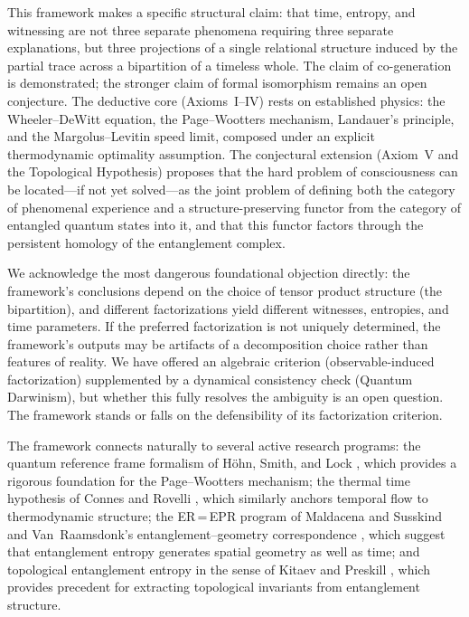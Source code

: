 \documentclass[12pt, a4paper]{article}
\begin{document}
This framework makes a specific structural claim: that time, entropy, and witnessing are not three separate phenomena requiring three separate explanations, but three projections of a single relational structure induced by the partial trace across a bipartition of a timeless whole. The claim of co-generation is demonstrated; the stronger claim of formal isomorphism remains an open conjecture. The deductive core (Axioms~I--IV) rests on established physics: the Wheeler--DeWitt equation, the Page--Wootters mechanism, Landauer's principle, and the Margolus--Levitin speed limit, composed under an explicit thermodynamic optimality assumption. The conjectural extension (Axiom~V and the Topological Hypothesis) proposes that the hard problem of consciousness can be located---if not yet solved---as the joint problem of defining both the category of phenomenal experience and a structure-preserving functor from the category of entangled quantum states into it, and that this functor factors through the persistent homology of the entanglement complex.

We acknowledge the most dangerous foundational objection directly: the framework's conclusions depend on the choice of tensor product structure (the bipartition), and different factorizations yield different witnesses, entropies, and time parameters. If the preferred factorization is not uniquely determined, the framework's outputs may be artifacts of a decomposition choice rather than features of reality. We have offered an algebraic criterion (observable-induced factorization) supplemented by a dynamical consistency check (Quantum Darwinism), but whether this fully resolves the ambiguity is an open question. The framework stands or falls on the defensibility of its factorization criterion.

The framework connects naturally to several active research programs: the quantum reference frame formalism of H\"{o}hn, Smith, and Lock \cite{Hohn2021}, which provides a rigorous foundation for the Page--Wootters mechanism; the thermal time hypothesis of Connes and Rovelli \cite{Connes1994}, which similarly anchors temporal flow to thermodynamic structure; the ER\,=\,EPR program of Maldacena and Susskind \cite{Maldacena2013} and Van~Raamsdonk's entanglement--geometry correspondence \cite{VanRaamsdonk2010}, which suggest that entanglement entropy generates spatial geometry as well as time; and topological entanglement entropy in the sense of Kitaev and Preskill \cite{Kitaev2006}, which provides precedent for extracting topological invariants from entanglement structure.
\end{document}
